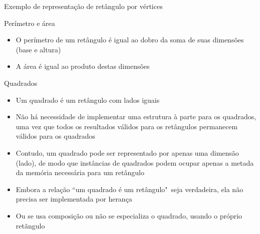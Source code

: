 \begin{frame}[fragile]{Exemplo de representação de retângulo por vértices}
\end{frame}

\begin{frame}[fragile]{Perímetro e área}

    \begin{itemize}
        \item O perímetro de um retângulo é igual ao dobro da soma de suas dimensões 
            (base e altura)

        \item A área é igual ao produto destas dimensões
    \end{itemize}

\end{frame}

\begin{frame}[fragile]{Quadrados}

    \begin{itemize}
        \item Um quadrado é um retângulo com lados iguais

        \item Não há necessidade de implementar uma estrutura à parte para os quadrados, 
            uma vez que todos os resultados válidos para os retângulos permanecem válidos para os 
            quadrados

        \item Contudo, um quadrado pode ser representado por apenas uma dimensão (lado), de modo
            que instâncias de quadrados podem ocupar apenas a metada da memória necessária
            para um retângulo

        \item Embora a relação ``um quadrado é um retângulo"\ seja verdadeira, ela não precisa
            ser implementada por herança

        \item Ou se usa composição ou não se especializa o quadrado, usando o próprio retãngulo
    \end{itemize}

\end{frame}

